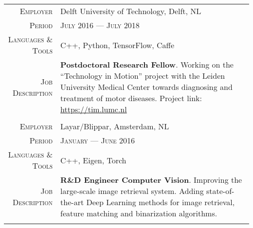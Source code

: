 \documentclass[a4paper, oneside, final]{scrartcl}
\newcommand{\gray}{\rowcolor[gray]{.90}}
\begin{document}
\begin{center}
\begin{tabular}{r@{\hskip 0.3in}p{11.3cm}}
			\gray \textsc{Employer}     & Delft University of Technology, Delft, NL\\
			\textsc{Period}             & \textsc{July 2016 --- July 2018} \\
			\textsc{Languages \& Tools} & C++, Python, TensorFlow, Caffe\\
			\textsc{Job Description}    & \textbf{Postdoctoral Research Fellow}. 
				Working on the ``Technology in Motion'' project with the Leiden University Medical Center 
				towards diagnosing and treatment of motor diseases.
				Project link: \href{https://tim.lumc.nl}{https://tim.lumc.nl}\\
			\multicolumn{2}{c}{}\\ %

			\gray \textsc{Employer}     & Layar\slash Blippar, Amsterdam, NL\\
			\textsc{Period}             & \textsc{January --- June 2016} \\
			\textsc{Languages \& Tools} & C++, Eigen, Torch\\
			\textsc{Job Description}    & \textbf{R\&D Engineer Computer Vision}. 
				Improving the large-scale image retrieval system. 
				Adding state-of-the-art Deep Learning methods for image retrieval, 
				feature matching and binarization algorithms.\\
			\multicolumn{2}{c}{}\\ %
		\end{tabular}


\end{center}
\end{document}
